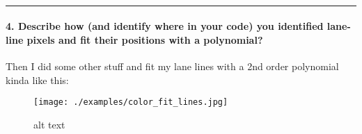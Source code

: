 \documentclass[11pt]{article}
\makeatletter
\def\maxwidth{\ifdim\Gin@nat@width>\linewidth\linewidth
    \else\Gin@nat@width\fi}
\let\Oldincludegraphics\includegraphics
\renewcommand{\includegraphics}[1]{\Oldincludegraphics[width=.8\maxwidth]{#1}}
\makeatother
\begin{document}
    \begin{center}
    \end{center}
    { \hspace*{\fill} \\}
    
    \begin{center}
    \end{center}
    { \hspace*{\fill} \\}
    
    \begin{center}
    \end{center}
    { \hspace*{\fill} \\}
    
    \begin{center}\rule{0.5\linewidth}{\linethickness}\end{center}

\hypertarget{describe-how-and-identify-where-in-your-code-you-identified-lane-line-pixels-and-fit-their-positions-with-a-polynomial}{%
\paragraph{4. Describe how (and identify where in your code) you
identified lane-line pixels and fit their positions with a
polynomial?}\label{describe-how-and-identify-where-in-your-code-you-identified-lane-line-pixels-and-fit-their-positions-with-a-polynomial}}

Then I did some other stuff and fit my lane lines with a 2nd order
polynomial kinda like this:

\begin{figure}
\centering
\texttt{[image: ./examples/color\_fit\_lines.jpg]}
\caption{alt text}
\end{figure}
\end{document}

